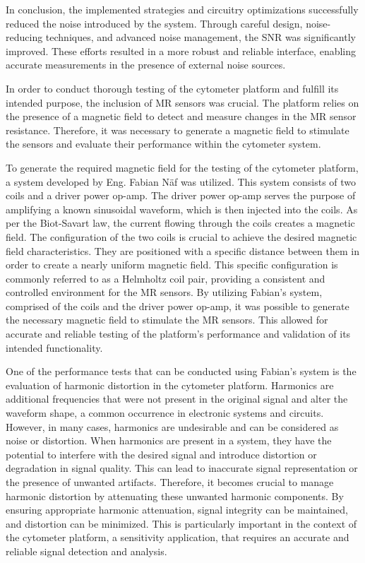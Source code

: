 In conclusion, the implemented strategies and circuitry optimizations successfully reduced the noise introduced by the system. Through careful design, noise-reducing techniques, and advanced noise management, the \ac{SNR} was significantly improved. These efforts resulted in a more robust and reliable interface, enabling accurate measurements in the presence of external noise sources.


\noindent
In order to conduct thorough testing of the cytometer platform and fulfill its intended purpose, the inclusion of \ac{MR} sensors was crucial. The platform relies on the presence of a magnetic field to detect and measure changes in the \ac{MR} sensor resistance. Therefore, it was necessary to generate a magnetic field to stimulate the sensors and evaluate their performance within the cytometer system.

To generate the required magnetic field for the testing of the cytometer platform, a system developed by Eng. Fabian Näf was utilized. This system consists of two coils and a driver power op-amp. The driver power op-amp serves the purpose of amplifying a known sinusoidal waveform, which is then injected into the coils. As per the Biot-Savart law, the current flowing through the coils creates a magnetic field. The configuration of the two coils is crucial to achieve the desired magnetic field characteristics. They are positioned with a specific distance between them in order to create a nearly uniform magnetic field. This specific configuration is commonly referred to as a Helmholtz coil pair, providing a consistent and controlled environment for the \ac{MR} sensors. By utilizing Fabian's system, comprised of the coils and the driver power op-amp, it was possible to generate the necessary magnetic field to stimulate the \ac{MR} sensors. This allowed for accurate and reliable testing of the platform's performance and validation of its intended functionality.

One of the performance tests that can be conducted using Fabian's system is the evaluation of harmonic distortion in the cytometer platform. Harmonics are additional frequencies that were not present in the original signal and alter the waveform shape, a common occurrence in electronic systems and circuits. However, in many cases, harmonics are undesirable and can be considered as noise or distortion. When harmonics are present in a system, they have the potential to interfere with the desired signal and introduce distortion or degradation in signal quality. This can lead to inaccurate signal representation or the presence of unwanted artifacts. Therefore, it becomes crucial to manage harmonic distortion by attenuating these unwanted harmonic components. By ensuring appropriate harmonic attenuation, signal integrity can be maintained, and distortion can be minimized. This is particularly important in the context of the cytometer platform, a sensitivity application, that requires an accurate and reliable signal detection and analysis.

